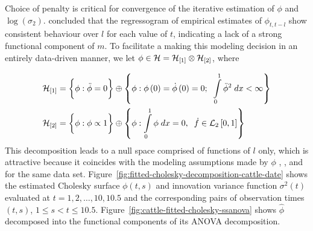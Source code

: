 Choice of penalty is critical for convergence of the iterative estimation of $\phi$ and $\log\left(\sigma_2 \right)$. \cite{pan2017jmcm} concluded that the regressogram of empirical estimates of $\phi_{t,t-l}$ show consistent behaviour over $l$ for each value of $t$, indicating a lack of a strong functional component of $m$. To facilitate a making this modeling decision in an entirely data-driven manner, we let $\phi \in \mathcal{H} = \mathcal{H}_{\left[1\right]} \otimes \mathcal{H}_{\left[2\right]}$, where 

\begin{align*} 
\mathcal{H}_{\left[1\right]} &= \bigg\{ \phi: \ddot{\phi} = 0 \bigg\} \oplus \left\{\phi: \phi\left(0\right) = \dot{\phi}\left(0\right) = 0; \;\; \int\limits_0^1 \ddot{\phi}^2 \;dx < \infty \right\} \\
\mathcal{H}_{\left[2\right]} &= \bigg\{ \phi: \phi \propto 1 \bigg\} \oplus \left\{ \phi: \int\limits_0^1 \phi \;dx = 0, \;\; \dot{f} \in \mathcal{L}_2\left[0,1\right]  \right\} 
\end{align*} 
\noindent
This decomposition leads to a null space comprised of functions of $l$ only, which is attractive because it coincides with the modeling assumptions made by $\phi$ \cite{pan2017jmcm}, \cite{huang2006covariance}, and \cite{wu2003nonparametric} for the same data set.  Figure~\ref{fig:fitted-cholesky-decomposition-cattle-date} shows the estimated Cholesky surface $\phi\left( t,s\right)$ and innovation variance function $\sigma^2\left(t\right)$ evaluated at $t = 1, 2, \dots, 10, 10.5$ and the corresponding pairs of observation times $\left(t,s\right)$, $1 \le s < t \le 10.5$. Figure~\ref{fig:cattle-fitted-cholesky-ssanova} shows $\hat{\phi}$ decomposed into the functional components of its ANOVA decomposition.

